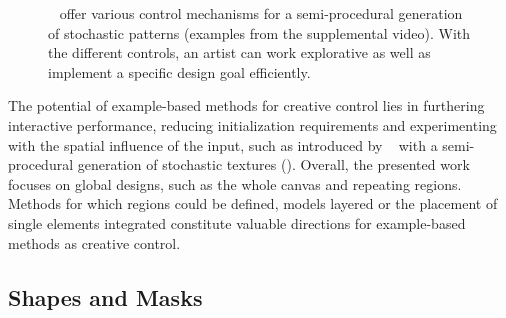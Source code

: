 \begin{figure}[H]
    \centering
    \caption{\label{fig:guehl_2020_stu}\citeauthor*{guehl_2020_stu}~\cite{guehl_2020_stu} offer various control mechanisms for a semi-procedural generation of stochastic patterns (examples from the supplemental video). With the different controls, an artist can work explorative as well as implement a specific design goal efficiently. }
\end{figure}

The potential of example-based methods for creative control lies in furthering interactive performance, reducing initialization requirements and experimenting with the spatial influence of the input, such as introduced by \citeauthor*{guehl_2020_stu}~\cite{guehl_2020_stu} with a semi-procedural generation of stochastic textures (). Overall, the presented work focuses on global designs, such as the whole canvas and repeating regions. Methods for which regions could be defined, models layered or the placement of single elements integrated constitute valuable directions for example-based methods as creative control.



\subsection{Shapes and Masks}
\label{subsubsec:analysis_creative_means_shapes}


